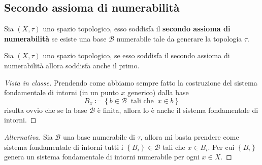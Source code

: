 \subsection{\textcolor{TopGener}{\textbf{Secondo assioma di numerabilità}}}



\begin{definition}
	Sia $(X,\tau)$ uno spazio topologico, esso soddisfa il \textbf{secondo assioma di numerabilità} se esiste una base $\mathcal{B}$ numerabile tale da generare la topologia $\tau$. 
\end{definition}

\begin{lemma}
	Sia $(X,\tau)$ uno spazio topologico, se esso soddisfa il secondo assioma di numerabilità allora soddisfa anche il primo. 
\end{lemma}
\begin{proof}[Vista in classe]
	Prendendo come abbiamo sempre fatto la costruzione del sistema fondamentale di intorni (in un punto $x$ generico) dalla base
	\begin{equation*}
	B_x \coloneqq \left\{ b \in \mathcal{B} \ \text{ tali che } \ x \in b \right\}
	\end{equation*}
	risulta ovvio che se la base $\mathcal{B}$ è finita, allora lo è anche il sistema fondamentale di intorni.
\end{proof}
\begin{proof}[Alternativa]
	Sia $\mathcal{B}$ una base numerabile di $\tau$, allora mi basta prendere come sistema fondamentale di intorni tutti i $\left\{B_i\right\} \in \mathcal{B}$ tali che $x \in B_i$. Per cui $\left\{B_i\right\}$ genera un sistema fondamentale di intorni numerabile per ogni $x \in X$.
\end{proof}

